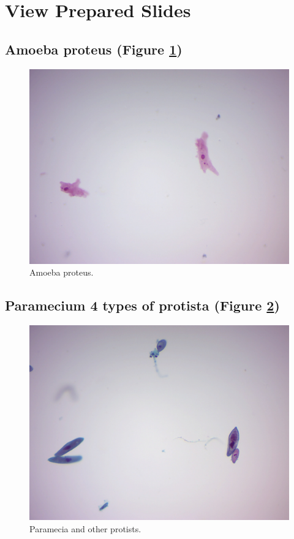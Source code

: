 \section{View Prepared Slides}\label{view-prepared-slides-3}

\subsection{Amoeba proteus (Figure
\ref{fig:amoebaprepared})}\label{amoeba-proteus-figure-reffigamoebaprepared}

\begin{figure}

{\centering \includegraphics[width=0.7\linewidth]{./figures/protists/Amoeba_proteus_prepared} 

}

\caption{Amoeba proteus.}\label{fig:amoebaprepared}
\end{figure}

\subsection{Paramecium 4 types of protista (Figure
\ref{fig:fourtypes})}\label{paramecium-4-types-of-protista-figure-reffigfourtypes}

\begin{figure}

{\centering \includegraphics[width=0.7\linewidth]{./figures/protists/Four_types_protista} 

}

\caption{Paramecia and other protists.}\label{fig:fourtypes}
\end{figure}

